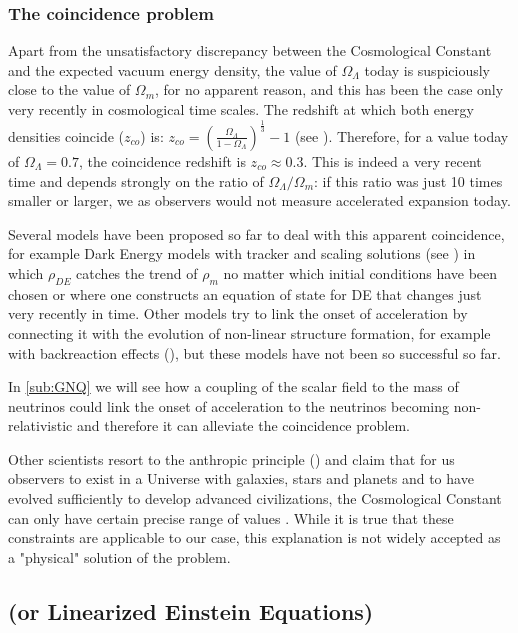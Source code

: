 \subsubsection*{The coincidence problem}

Apart from the unsatisfactory discrepancy between the Cosmological Constant and the expected 
vacuum energy density, the value of $\Omega_{\Lambda}$ today is suspiciously close to the 
value of $\Omega_m$, for no apparent reason, and this has been the case only very recently in cosmological time scales. The redshift at which both energy densities coincide ($z_{co}$) is:
\beeqp$
z_{co} = \left( \frac{\Omega_{\Lambda}}{1-\Omega_{\Lambda}}  \right)^{\frac{1}{3}} -1$
(see ).
Therefore, for a value today of $\Omega_{\Lambda}=0.7$, the coincidence redshift is $z_{co}\approx 0.3$.
This is indeed a very recent time and depends strongly on the ratio of $\Omega_{\Lambda}/\Omega_{m}$:
if this ratio was just 10 times smaller or larger, we as observers would not measure accelerated expansion today.

Several models have been proposed so far to deal with this apparent coincidence, for example
Dark Energy models with tracker and scaling solutions (see ) in which $\rho_{DE}$ catches the trend of $\rho_{m}$ no matter which initial conditions have been chosen
or where one constructs an equation of state for DE that changes just very recently in time.
Other models try to link the onset of acceleration by connecting it with the evolution of non-linear
structure formation, for example with backreaction effects (), 
but these models have not been so successful so far.

In \cref{sub:GNQ} we will see how a coupling of the scalar field to the mass of neutrinos 
could link the onset of acceleration to the neutrinos becoming non-relativistic and therefore
it can alleviate the coincidence problem.
 
Other scientists resort to the anthropic principle ()
and claim that for us observers to exist in a Universe with galaxies, stars and planets
and to have evolved sufficiently to develop advanced civilizations, the Cosmological Constant
can only have certain precise range of values . While it is true that these constraints are applicable
to our case, this explanation is not widely accepted as a "physical" solution of the problem.


\subsection{ (or Linearized Einstein Equations)}

